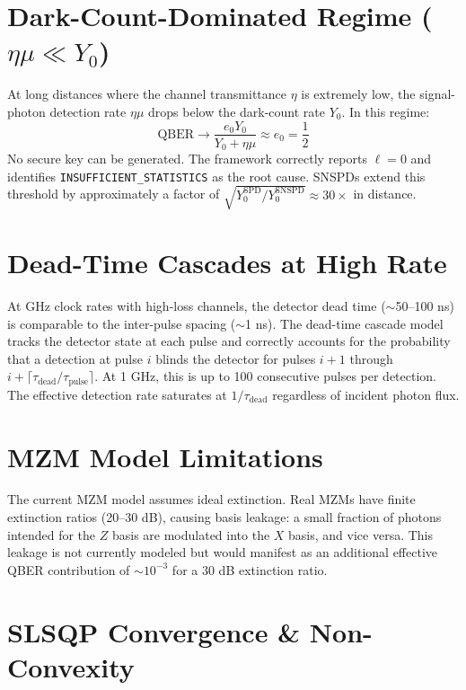 \documentclass[11pt,a4paper,oneside]{report}
\begin{document}
\section{Dark-Count-Dominated Regime ($\eta \mu \ll Y_0$)}

At long distances where the channel transmittance $\eta$ is extremely low, the signal-photon detection rate $\eta\mu$ drops below the dark-count rate $Y_0$. In this regime:
\begin{equation}
\text{QBER} \to \frac{e_0 Y_0}{Y_0 + \eta\mu} \approx e_0 = \frac{1}{2}
\end{equation}
No secure key can be generated. The framework correctly reports $\ell = 0$ and identifies \texttt{INSUFFICIENT\_STATISTICS} as the root cause. SNSPDs extend this threshold by approximately a factor of $\sqrt{Y_0^{\text{SPD}}/Y_0^{\text{SNSPD}}} \approx 30\times$ in distance.

\section{Dead-Time Cascades at High Rate}

At GHz clock rates with high-loss channels, the detector dead time ($\sim$50–100 ns) is comparable to the inter-pulse spacing ($\sim$1 ns). The dead-time cascade model tracks the detector state at each pulse and correctly accounts for the probability that a detection at pulse $i$ blinds the detector for pulses $i+1$ through $i+\lceil\tau_{\text{dead}}/\tau_{\text{pulse}}\rceil$. At 1 GHz, this is up to 100 consecutive pulses per detection. The effective detection rate saturates at $1/\tau_{\text{dead}}$ regardless of incident photon flux.

\section{MZM Model Limitations}

The current MZM model assumes ideal extinction. Real MZMs have finite extinction ratios (20–30 dB), causing basis leakage: a small fraction of photons intended for the $Z$ basis are modulated into the $X$ basis, and vice versa. This leakage is not currently modeled but would manifest as an additional effective QBER contribution of $\sim 10^{-3}$ for a 30 dB extinction ratio.

\section{SLSQP Convergence \& Non-Convexity}
\end{document}
